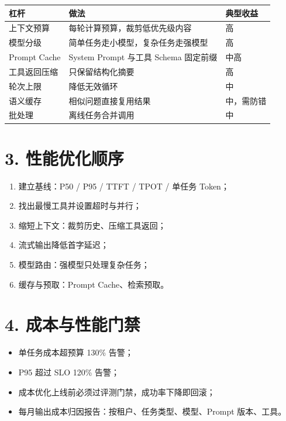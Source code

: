 \documentclass[9pt,a4paper,twocolumn]{ctexart}
\begin{document}
{\footnotesize
\begin{tabular}{|p{}|p{}|p{}|}
\hline
\textbf{杠杆} & \textbf{做法} & \textbf{典型收益} \\
\hline
上下文预算 & 每轮计算预算，裁剪低优先级内容 & 高 \\
\hline
模型分级 & 简单任务走小模型，复杂任务走强模型 & 高 \\
\hline
Prompt Cache & System Prompt 与工具 Schema 固定前缀 & 中高 \\
\hline
工具返回压缩 & 只保留结构化摘要 & 高 \\
\hline
轮次上限 & 降低无效循环 & 中 \\
\hline
语义缓存 & 相似问题直接复用结果 & 中，需防错 \\
\hline
批处理 & 离线任务合并调用 & 中 \\
\hline
\end{tabular}
}



\section*{3. 性能优化顺序}

\begin{enumerate}[itemsep=1pt, topsep=2pt]
  \item 建立基线：P50 / P95 / TTFT / TPOT / 单任务 Token；
  \item 找出最慢工具并设置超时与并行；
  \item 缩短上下文：裁剪历史、压缩工具返回；
  \item 流式输出降低首字延迟；
  \item 模型路由：强模型只处理复杂任务；
  \item 缓存与预取：Prompt Cache、检索预取。
\end{enumerate}


\section*{4. 成本与性能门禁}

\begin{itemize}[itemsep=1pt, topsep=2pt]
  \item 单任务成本超预算 130\% 告警；
  \item P95 超过 SLO 120\% 告警；
  \item 成本优化上线前必须过评测门禁，成功率下降即回滚；
  \item 每月输出成本归因报告：按租户、任务类型、模型、Prompt 版本、工具。
\end{itemize}
\end{document}
